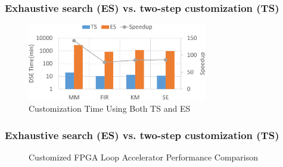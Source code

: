 \documentclass[accentcolor=tud1a,colorbacktitle,inverttitle,landscape,german,presentation,t]{tudbeamer}
\begin{document}
  \begin{frame}
  \frametitle{Exhaustive search (ES) vs. two-step customization (TS)}
  \vspace{1em}
  \begin{figure}[htb]
    \centering
    \includegraphics[width=0.7\textwidth]{DSE-Time}
    \caption{Customization Time Using Both TS and ES}
    \label{fig:DSE-Time}
  \end{figure}
  \end{frame}

  \begin{frame}
  \frametitle{Exhaustive search (ES) vs. two-step customization (TS)}
  \vspace{-1em}
  \begin{figure}[htb]
  \centering
    \hfill
    \vspace{-0.6em}
    \caption{Customized FPGA Loop Accelerator Performance Comparison}
  \label{fig:DSE}
  \end{figure}

  \end{frame}
\end{document}
